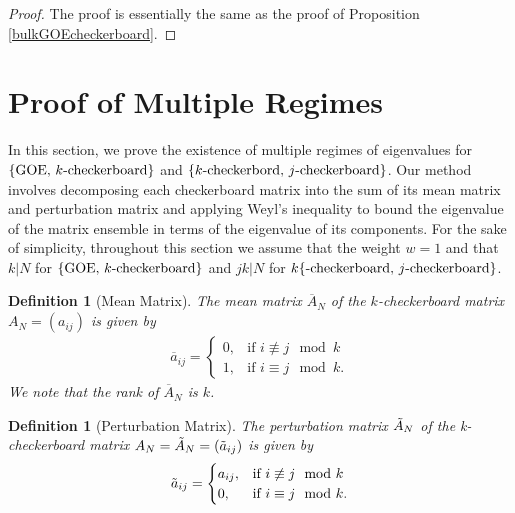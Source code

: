 \documentclass[11pt,reqno]{amsart}
\numberwithin{equation}{section}
\theoremstyle{plain}
\newtheorem{definition}[thm]{Definition}
\begin{document}
\begin{proof}
The proof is essentially the same as the proof of Proposition \ref{bulkGOEcheckerboard}.
\end{proof}

\section{Proof of Multiple Regimes}\label{multipleregimes}

In this section, we prove the existence of multiple regimes of eigenvalues for $\{\textup{GOE, }k\textup{-checkerboard}\}$ and $\{k\textup{-checkerbord, }j\textup{-checkerboard}\}$. Our method involves decomposing each checkerboard matrix into the sum of its mean matrix and perturbation matrix and applying Weyl's inequality to bound the eigenvalue of the matrix ensemble in terms of the eigenvalue of its components. For the sake of simplicity, throughout this section we assume that the weight $w=1$ and that $k|N$ for $\{\textup{GOE, }k\textup{-checkerboard}\}$ and $jk|N$ for $k\{\textup{-checkerboard, }j\textup{-checkerboard}\}$.

\begin{definition}[Mean Matrix]
The mean matrix $\overline{A}_N$ of the $k$-checkerboard matrix $A_N=(a_{ij})$ is given by
\begin{align}
\overline{a}_{ij}=
\begin{cases}
0,& \text{if }i\not\equiv j\mod{k}\\
1,& \text{if }i\equiv j\mod{k}.
\end{cases}
\end{align}
We note that the rank of $\overline{A}_N$ is $k$.
\end{definition}

\begin{definition}[Perturbation Matrix]
The perturbation matrix $\Tilde{A}_N$ of the k-checkerboard matrix $A_N=\Tilde{A}_N=(\Tilde{a}_{ij})$ is given by
\begin{align}
\Tilde{a}_{ij}=
\begin{cases}
a_{ij},& \text{if }i\not\equiv j\mod{k}\\
0,& \text{if }i\equiv j\mod{k}.
\end{cases}
\end{align}
\end{definition}
\end{document}
